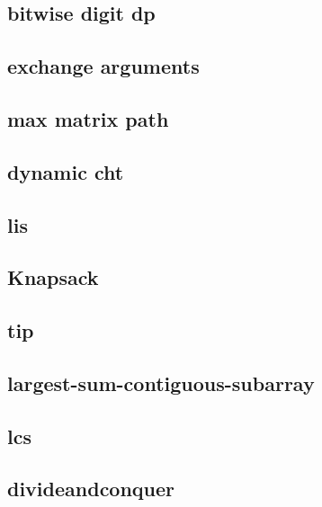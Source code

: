 \subsection{bitwise digit dp}
\raggedbottom
\hrulefill
\subsection{exchange arguments}
\raggedbottom
\hrulefill
\subsection{max matrix path}
\raggedbottom
\hrulefill
\subsection{dynamic cht}
\raggedbottom
\hrulefill
\subsection{lis}
\raggedbottom
\hrulefill
\subsection{Knapsack}
\raggedbottom
\hrulefill
\subsection{tip}
\raggedbottom
\hrulefill
\subsection{largest-sum-contiguous-subarray}
\raggedbottom
\hrulefill
\subsection{lcs}
\raggedbottom
\hrulefill
\subsection{divideandconquer}
\raggedbottom
\hrulefill
